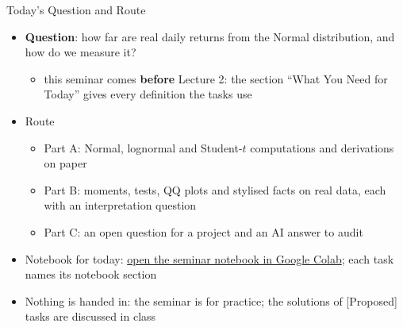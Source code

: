 \begin{frame}{Today's Question and Route}
\itemsize{\small}
\begin{itemize}
    \item \textbf{Question}: how far are real daily returns from the Normal distribution, and how do we measure it?
    \begin{itemize}
        \item this seminar comes \textbf{before} Lecture 2: the section ``What You Need for Today'' gives every definition the tasks use
    \end{itemize}
    \item Route
    \begin{itemize}
        \item Part A: Normal, lognormal and Student-$t$ computations and derivations on paper
        \item Part B: moments, tests, QQ plots and stylised facts on real data, each with an interpretation question
        \item Part C: an open question for a project and an AI answer to audit
    \end{itemize}
    \item Notebook for today: \href{\nb}{open the seminar notebook in Google Colab}; each task names its notebook section
    \item Nothing is handed in: the seminar is for practice; the solutions of [Proposed] tasks are discussed in class
\end{itemize}
\end{frame}

